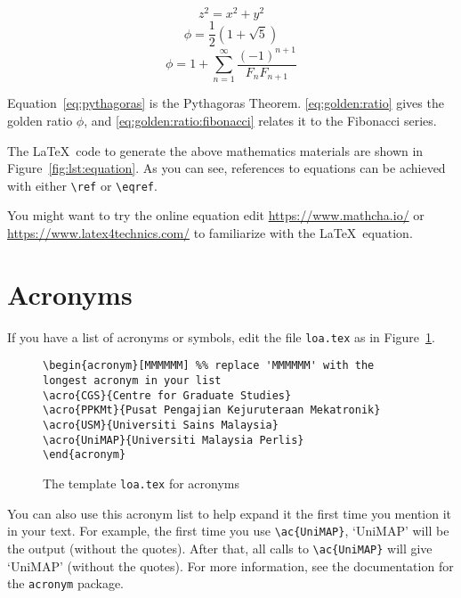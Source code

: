 \begin{equation}\label{eq:pythagoras}
z^2 = x^2 + y^2
\end{equation}
\begin{equation}\label{eq:golden:ratio}
\phi = \frac{1}{2} (1 + \sqrt{5})
\end{equation}
\begin{equation}\label{eq:golden:ratio:fibonacci}
\phi = 1 + \sum ^ {\infty} _ {n=1}
                \frac{ (-1) ^ {n+1} }{ F_n F_{n+1} }
\end{equation}

Equation~\ref{eq:pythagoras} is the Pythagoras Theorem. \eqref{eq:golden:ratio} gives the golden ratio $\phi$, and \eqref{eq:golden:ratio:fibonacci} relates it to the Fibonacci series.

The \LaTeX\ code to generate the above mathematics materials are shown in Figure~\ref{fig:lst:equation}.  As you can see, references to equations can be achieved with either \verb|\ref| or \verb|\eqref|. 

You might want to try the online equation edit \url{https://www.mathcha.io/} or \url{https://www.latex4technics.com/} to familiarize with the \LaTeX\ equation. 

\section{Acronyms}
\acresetall
If you have a list of acronyms or symbols, edit the file \verb|loa.tex| as in Figure~\ref{fig:acronym}.

\begin{figure}[hbt!]
\begin{lstlisting}
\begin{acronym}[MMMMMM] %% replace 'MMMMMM' with the longest acronym in your list
\acro{CGS}{Centre for Graduate Studies}
\acro{PPKMt}{Pusat Pengajian Kejuruteraan Mekatronik}
\acro{USM}{Universiti Sains Malaysia}
\acro{UniMAP}{Universiti Malaysia Perlis}
\end{acronym}
\end{lstlisting}
\caption{The template \texttt{loa.tex} for acronyms}\label{fig:acronym}
\end{figure}

You can also use this acronym list to help expand it the first time you mention it in your text.  For example, the first time you use \verb|\ac{UniMAP}|, `\ac{UniMAP}' will be the output (without the quotes).  After that, all calls to \verb|\ac{UniMAP}| will give `\ac{UniMAP}' (without the quotes).  For more information, see the documentation for the \texttt{acronym} package.

